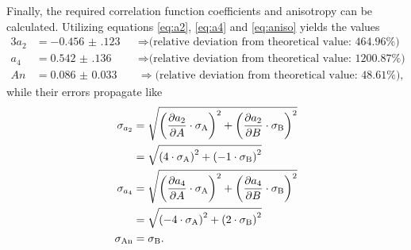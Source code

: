 Finally, the required correlation function coefficients and anisotropy can be calculated.
Utilizing equations \ref{eq:a2}, \ref{eq:a4} and \ref{eq:aniso} yields the values
\begin{alignat*}{3}
	a_2 &= \num{-0.456(123)} &&\Rightarrow \text{(relative deviation from theoretical value: 464.96\%)}\\
	a_4 &= \num{0.542(136)}  &&\Rightarrow \text{(relative deviation from theoretical value: 1200.87\%)} \\
	An  &= \num{0.086(33)}   &&\Rightarrow \text{(relative deviation from theoretical value: 48.61\%)},
\end{alignat*}
while their errors propagate like
\begin{align}
	\sigma_\text{$a_2$} &= \sqrt{\left(\frac{\partial a_2}{\partial A}\cdot\sigma_\text{A}\right)^2 + \left(\frac{\partial a_2}{\partial B}\cdot\sigma_\text{B}\right)^2} \label{eq:err_a}\\
	&=\sqrt{\left(4\cdot\sigma_\text{A} \right)^2 + \left(-1\cdot\sigma_\text{B} \right)^2} \nonumber\\
	\sigma_\text{$a_4$} &= \sqrt{\left(\frac{\partial a_4}{\partial A}\cdot\sigma_\text{A}\right)^2 + \left(\frac{\partial a_4}{\partial B}\cdot\sigma_\text{B}\right)^2}\nonumber \\
	&=\sqrt{\left(-4\cdot\sigma_\text{A} \right)^2 + \left(2\cdot\sigma_\text{B} \right)^2}\nonumber \\
	\sigma_\text{An} &= \sigma_\text{B}\nonumber.
\end{align}

